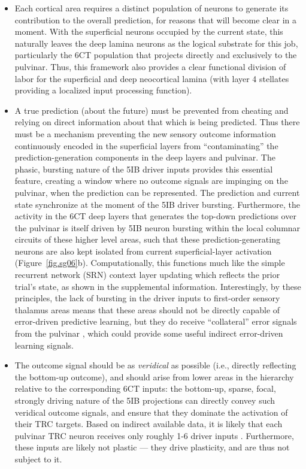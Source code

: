 \documentclass[11pt,twoside]{article}
\newif\myifpdf
\begin{document}
\begin{itemize}
	\item Each cortical area requires a distinct population of neurons to generate its contribution to the overall prediction, for reasons that will become clear in a moment. With the superficial neurons occupied by the current state, this naturally leaves the deep lamina neurons as the logical substrate for this job, particularly the 6CT population that projects directly and exclusively to the pulvinar.  Thus, this framework also provides a clear functional division of labor for the superficial and deep neocortical lamina (with layer 4 stellates providing a localized input processing function).
	
	\item A true prediction (about the future) must be prevented from cheating and relying on direct information about that which is being predicted.  Thus there must be a mechanism preventing the new sensory outcome information continuously encoded in the superficial layers from ``contaminating'' the prediction-generation components in the deep layers and pulvinar.  The phasic, bursting nature of the 5IB driver inputs provides this essential feature, creating a window where no outcome signals are impinging on the pulvinar, when the prediction can be represented.  The prediction and current state synchronize at the moment of the 5IB driver bursting.  Furthermore, the activity in the 6CT deep layers that generates the top-down predictions over the pulvinar is itself driven by 5IB neuron bursting within the local columnar circuits of these higher level areas, such that these prediction-generating neurons are also kept isolated from current superficial-layer activation (Figure~\ref{fig.sg06}b).  Computationally, this functions much like the simple recurrent network (SRN) context layer updating \citep{Elman90,Jordan89} which reflects the prior trial's state, as shown in the supplemental information.  Interestingly, by these principles, the lack of bursting in the driver inputs to first-order sensory thalamus areas \citep{ShermanGuillery06} means that these areas should not be directly capable of error-driven predictive learning, but they do receive ``collateral'' error signals from the pulvinar \citep{Shipp03}, which could provide some useful indirect error-driven learning signals.

	\item The outcome signal should be as \emph{veridical} as possible (i.e., directly reflecting the bottom-up outcome), and should arise from lower areas in the hierarchy relative to the corresponding 6CT inputs: the bottom-up, sparse, focal, strongly driving nature of the 5IB projections can directly convey such veridical outcome signals, and ensure that they dominate the activation of their TRC targets.  Based on indirect available data, it is likely that each pulvinar TRC neuron receives only roughly 1-6 driver inputs \citep{ShermanGuillery06,ShermanGuillery11}.  Furthermore, these inputs are likely not plastic \citep{UsreySherman18} --- they drive plasticity, and are thus not subject to it. 


\end{itemize}
\end{document}

